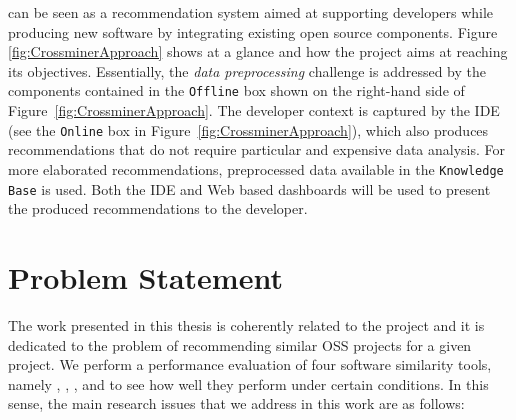 \CROSSMINER can be seen as a recommendation system aimed at supporting developers while producing new software by integrating existing open source components. Figure \ref{fig:CrossminerApproach} shows \CROSSMINER at a glance and how the project aims at reaching its objectives. Essentially, the \textit{data preprocessing} challenge is addressed by the \CROSSMINER components contained in the \texttt{Offline} box shown on the right-hand side of Figure~\ref{fig:CrossminerApproach}. The developer context is captured by the IDE (see the \texttt{Online} box in Figure~\ref{fig:CrossminerApproach}), which also produces recommendations that do not require particular and expensive data analysis. For more elaborated recommendations, preprocessed data available in the \texttt{Knowledge Base} is used. Both the IDE and Web based dashboards will be used to present the produced recommendations to the developer. 


\section{Problem Statement}

The work presented in this thesis is coherently related to the \projectName project and it is dedicated to the problem of recommending similar OSS projects for a given project. We perform a performance evaluation of four software similarity tools, namely \MUDABlue \cite{10.1109/APSEC.2004.69}, \CLAN \cite{McMillan:2012:DSS:2337223.2337267}, \RepoPal \cite{10.1109/SANER.2017.7884605}, and \CrossSim \cite{NDRDSEAA2018} to see how well they perform under certain conditions. In this sense, the main research issues that we address in this work are as follows:

